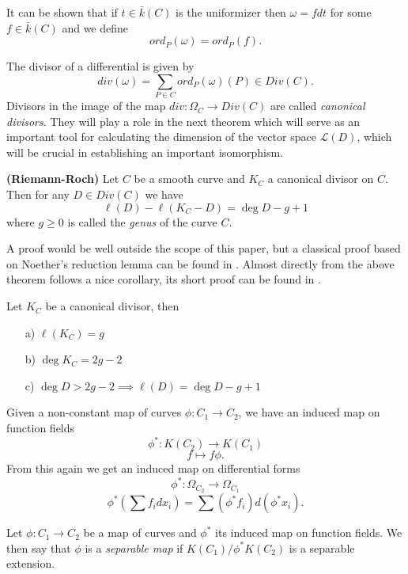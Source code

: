 It can be shown that if $t\in \bar{k}(C)$ is the uniformizer \cite{Fulton} then
$\omega = f dt$ for some $f\in \bar{k}(C)$ and we define
$$ord_P(\omega) = ord_P(f).$$

The divisor of a differential is given by
$$ div(\omega) = \sum_{P\in C} ord_P(\omega)(P) \in Div(C).$$
Divisors in the image of the map $div: \Omega_C \rightarrow Div(C)$ are called
\emph{canonical divisors}. They will play a role in the next theorem which will
serve as an important tool for calculating the dimension of the vector space
$\mathscr{L}(D)$, which will be crucial in establishing an important isomorphism.

\begin{thm}
 \textbf{(Riemann-Roch)}
  Let $C$ be a smooth curve and $K_C$ a canonical divisor on $C$. Then for
any $D \in Div(C)$ we have
$$ \ell(D) - \ell(K_C - D) = \deg D - g + 1 $$
where $g \geq 0$ is called the \emph{genus} of the curve $C$.
\end{thm}

 A proof would be well outside the scope of this paper, but a classical proof based
on Noether's reduction lemma can be found in \cite{Fulton}. Almost directly from the
above theorem follows a nice corollary, its short proof can be found in \cite{AEC}.

\begin{cor} \label{rrcor}
Let $K_C$ be a canonical divisor, then
 \begin{enumerate}
  \item[a)] $\ell(K_C) = g$
  \item[b)] $\deg K_C = 2g - 2$
  \item[c)] $\deg D > 2g - 2 \implies \ell(D) = \deg D - g + 1$ 
 \end{enumerate}
\end{cor}

Given a non-constant map of curves $\phi: C_1 \rightarrow C_2$, we have an induced map
on function fields $$\phi^*: K(C_2) \rightarrow K(C_1)$$
$$f \mapsto f \phi.$$
From this again we get an induced
map on differential forms
$$ \phi^*: \Omega_{C_2} \rightarrow \Omega_{C_1} $$
$$ \phi^*\left(\sum f_i dx_i\right) = \sum (\phi^* f_i) d(\phi^* x_i).$$
\label{diff}

\begin{mydef} 
 Let $\phi: C_1 \rightarrow C_2$ be a map of curves and $\phi^*$ its induced map on
function fields. We then say that $\phi$ is a \emph{separable map} if
$K(C_1)/\phi^* K(C_2)$ is a separable extension.
\end{mydef}

